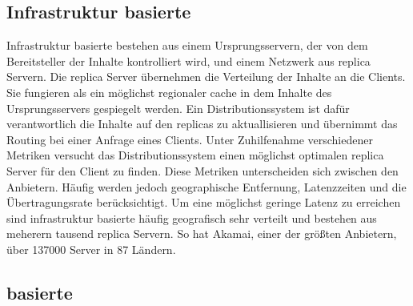 \subsection{Infrastruktur basierte \cdns}
Infrastruktur basierte \cdns bestehen aus einem Ursprungsservern, der von dem Bereitsteller der Inhalte kontrolliert wird, und einem Netzwerk aus replica Servern. Die replica Server übernehmen die Verteilung der Inhalte an die Clients. Sie fungieren als ein möglichst regionaler cache in dem Inhalte des Ursprungsservers gespiegelt werden. Ein Distributionssystem ist dafür verantwortlich die Inhalte auf den replicas zu aktuallisieren und übernimmt das Routing bei einer Anfrage eines Clients. Unter Zuhilfenahme verschiedener Metriken versucht das Distributionssystem einen möglichst optimalen replica Server für den Client zu finden. Diese Metriken unterscheiden sich zwischen den Anbietern. Häufig werden jedoch geographische Entfernung, Latenzzeiten und die Übertragungsrate berücksichtigt. Um eine möglichst geringe Latenz zu erreichen sind infrastruktur basierte \cdns häufig geografisch sehr verteilt und bestehen aus meherern tausend replica Servern. So hat Akamai, einer der größten \cdn Anbietern, über 137000 Server in 87 Ländern. \cite{akamaiPeer} 


\subsection{\pTp basierte \cdns }



%
%

